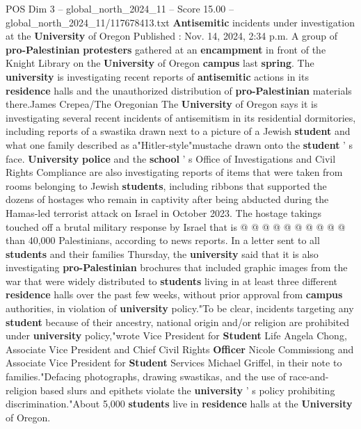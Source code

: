 \begin{textsample}{POS Dim 3 – global\_north\_2024\_11 – Score 15.00 – global\_north\_2024\_11/117678413.txt}  \label{ex:f3_pos_181}
\textbf{Antisemitic} incidents under investigation at the \textbf{University} of Oregon Published : Nov. 14, 2024, 2:34 p.m.
A group of \textbf{pro-Palestinian} \textbf{protesters} gathered at an \textbf{encampment} in front of the Knight Library on the \textbf{University} of Oregon \textbf{campus} last \textbf{spring}.
The \textbf{university} is investigating recent reports of \textbf{antisemitic} actions in its \textbf{residence} halls and the unauthorized distribution of \textbf{pro-Palestinian} materials there.James Crepea/The Oregonian The \textbf{University} of Oregon says it is investigating several recent incidents of antisemitism in its residential dormitories, including reports of a swastika drawn next to a picture of a Jewish \textbf{student} and what one family described as a"Hitler-style"mustache drawn onto the \textbf{student} ' s face. \textbf{University} \textbf{police} and the \textbf{school} ' s Office of Investigations and Civil Rights Compliance are also investigating reports of items that were taken from rooms belonging to Jewish \textbf{students}, including ribbons that supported the dozens of hostages who remain in captivity after being abducted during the Hamas-led terrorist attack on Israel in October 2023.
The hostage takings touched off a brutal military response by Israel that is @ @ @ @ @ @ @ @ @ @ than 40,000 Palestinians, according to news reports.
In a letter sent to all \textbf{students} and their families Thursday, the \textbf{university} said that it is also investigating \textbf{pro-Palestinian} brochures that included graphic images from the war that were widely distributed to \textbf{students} living in at least three different \textbf{residence} halls over the past few weeks, without prior approval from \textbf{campus} authorities, in violation of \textbf{university} policy."To be clear, incidents targeting any \textbf{student} because of their ancestry, national origin and/or religion are prohibited under \textbf{university} policy,"wrote Vice President for \textbf{Student} Life Angela Chong, Associate Vice President and Chief Civil Rights \textbf{Officer} Nicole Commissiong and Associate Vice President for \textbf{Student} Services Michael Griffel, in their note to families."Defacing photographs, drawing swastikas, and the use of race-and-religion based slurs and epithets violate the \textbf{university} ' s policy prohibiting discrimination."About 5,000 \textbf{students} live in \textbf{residence} halls at the \textbf{University} of Oregon.

\end{textsample}
